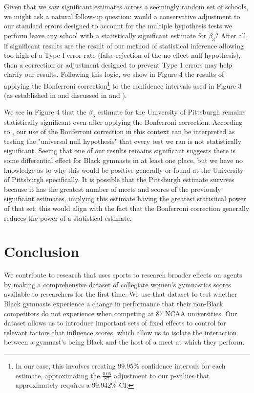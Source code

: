 \documentclass[12pt]{article}
\begin{document}
Given that we saw significant estimates across a seemingly random set of schools, we might ask a natural follow-up question: would a conservative adjustment to our standard errors designed to account for the multiple hypothesis tests we perform leave any school with a statistically significant estimate for $\beta_3$? After all, if significant results are the result of our method of statistical inference allowing too high of a Type I error rate (false rejection of the no effect null hypothesis), then a correction or adjustment designed to prevent Type 1 errors may help clarify our results. Following this logic, we show in Figure 4 the results of applying the Bonferroni correction\footnote{In our case, this involves creating 99.95\% confidence intervals for each estimate, approximating the $\frac{0.05}{87}$ adjustment to our p-values that approximately requires a 99.942\% CI.} to the confidence intervals used in Figure 3 (as established in \cite{dunn_1961} and discussed in \cite{armstrong_2014} and \cite{vanderweele_mathur_2019}). 

We see in Figure 4 that the $\beta_3$ estimate for the University of Pittsburgh remains statistically significant even after applying the Bonferroni correction. According to \citep{armstrong_2014}, our use of the Bonferroni correction in this context can be interpreted as testing the "universal null hypothesis" that every test we ran is not statistically significant. Seeing that one of our results remains significant suggests there is some differential effect for Black gymnasts in at least one place, but we have no knowledge as to why this would be positive generally or found at the University of Pittsburgh specifically. It is possible that the Pittsburgh estimate survives because it has the greatest number of meets and scores of the previously significant estimates, implying this estimate having the greatest statistical power of that set; this would align with the fact that the Bonferroni correction generally reduces the power of a statistical estimate.





\section{Conclusion}

We contribute to research that uses sports to research broader effects on agents by making a comprehensive dataset of collegiate women’s gymnastics scores available to researchers for the first time. We use that dataset to test whether Black gymnasts experience a change in performance that their non-Black competitors do not experience when competing at 87 NCAA universities. Our dataset allows us to introduce important sets of fixed effects to control for relevant factors that influence scores, which allow us to isolate the interaction between a gymnast’s being Black and the host of a meet at which they perform.
\end{document}
